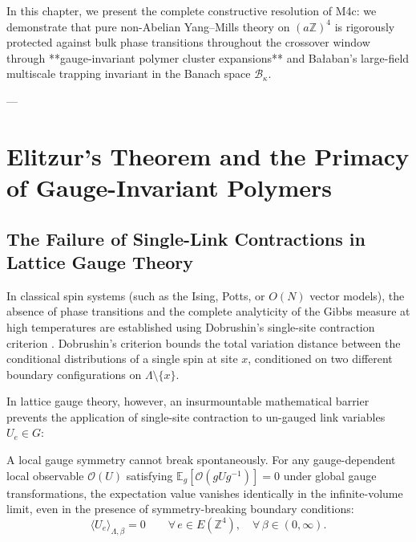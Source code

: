 In this chapter, we present the complete constructive resolution of M4c: we demonstrate that pure non-Abelian Yang--Mills theory on $(a \mathbb{Z})^4$ is rigorously protected against bulk phase transitions throughout the crossover window through **gauge-invariant polymer cluster expansions** and Ba\l aban's large-field multiscale trapping invariant in the Banach space $\mathcal{B}_\kappa$.

---

\section{Elitzur's Theorem and the Primacy of Gauge-Invariant Polymers}
\label{sec:elitzur_and_polymers}

\subsection{The Failure of Single-Link Contractions in Lattice Gauge Theory}
\label{subsec:failure_single_link}

In classical spin systems (such as the Ising, Potts, or $O(N)$ vector models), the absence of phase transitions and the complete analyticity of the Gibbs measure at high temperatures are established using Dobrushin's single-site contraction criterion \cite{Dobrushin1968,DobrushinShlosman1985}. Dobrushin's criterion bounds the total variation distance between the conditional distributions of a single spin at site $x$, conditioned on two different boundary configurations on $\Lambda \setminus \{x\}$.

In lattice gauge theory, however, an insurmountable mathematical barrier prevents the application of single-site contraction to un-gauged link variables $U_e \in G$:
\begin{theorem}
\label{thm:elitzur}
A local gauge symmetry cannot break spontaneously. For any gauge-dependent local observable $\mathcal{O}(U)$ satisfying $\mathbb{E}_{g}[\mathcal{O}(g U g^{-1})] = 0$ under global gauge transformations, the expectation value vanishes identically in the infinite-volume limit, even in the presence of symmetry-breaking boundary conditions:
\begin{equation}
\label{eq:ch13_elitzur_vev_zero}
\langle U_e \rangle_{\Lambda, \beta} = 0 \qquad \forall \, e \in E(\mathbb{Z}^4), \quad \forall \, \beta \in (0, \infty).
\end{equation}
\end{theorem}

